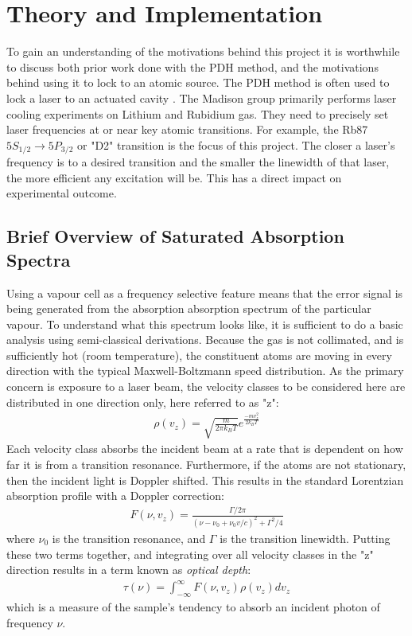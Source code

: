 \newpage
\section{Theory and Implementation} \label{sec:theory}

To gain an understanding of the motivations behind this project it is worthwhile to discuss both prior work done with the PDH method, and the motivations behind using it to lock to an atomic source.  The PDH method is often used to lock a laser to an actuated cavity \cite{black1998}.  The Madison group primarily performs laser cooling experiments on Lithium and Rubidium gas.  They need to precisely set laser frequencies at or near key atomic transitions. For example, the Rb87 $5S_{1/2} \rightarrow 5P_{3/2}$ or "D2" transition is the focus of this project.  The closer a laser's frequency is to a desired transition and the smaller the linewidth of that laser, the more efficient any excitation will be.  This has a direct impact on experimental outcome.

\subsection{Brief Overview of Saturated Absorption Spectra}

Using a vapour cell as a frequency selective feature means that the error signal
is being generated from the absorption absorption spectrum of the particular
vapour. To understand what this spectrum looks like, it is sufficient to do a
basic analysis using semi-classical derivations. Because the gas is not
collimated, and is sufficiently hot (room temperature), the constituent
atoms are moving in every direction with the typical Maxwell-Boltzmann speed
distribution. As the primary concern is exposure to a laser beam, the
velocity classes to be considered here are distributed in one direction only,
here referred to as "z":
\begin{gather}
  \rho(v_z) = \sqrt{\frac{m}{2\pi k_B T}} e^{\frac{-m v_z^2}{2k_B T}}
\end{gather}
Each velocity class absorbs the incident beam at a rate that is dependent on
how far it is from a transition resonance. Furthermore, if the atoms are not
stationary, then the incident light is Doppler shifted. This results in the
standard Lorentzian absorption profile with a Doppler correction:
\begin{gather}
  F(\nu, v_z) = \frac{\Gamma / 2 \pi}{(\nu - \nu_0 + \nu_0 v / c)^2 +
  \Gamma^2 / 4}
\end{gather}
where $\nu_0$ is the transition resonance, and $\Gamma$ is the transition
linewidth. Putting these two terms together, and integrating over all velocity
classes in the "z" direction results in a term known as \emph{optical depth}:
\begin{gather}
  \tau(\nu) = \int_{-\infty}^\infty F(\nu, v_z) \rho(v_z) dv_z
\end{gather}
which is a measure of the sample's tendency to absorb an incident photon of
frequency $\nu$. \\

